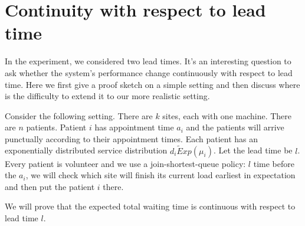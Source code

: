 \section{Continuity with respect to lead time}

In the experiment, we considered two lead times. It's an interesting question
to ask whether the system's performance change continuously with respect to
lead time. Here we first give a proof sketch on a simple setting and then discuss
where is the difficulty to extend it to our more realistic setting.

Consider the following setting. There are $k$ sites, each with one machine.
There are $n$ patients. Patient $i$ has appointment time $a_i$
and the patients will arrive punctually according to their appointment times.
Each patient has an exponentially distributed service distribution $d_i \tilde Exp(\mu_i)$.
Let the lead time be $l$. Every patient is volunteer and we use a
join-shortest-queue policy: $l$ time before the $a_i$, we will check which site
will finish its current load earliest in expectation and then put the patient $i$ there.

We will prove that the expected total waiting time is continuous with
respect to lead time $l$.


